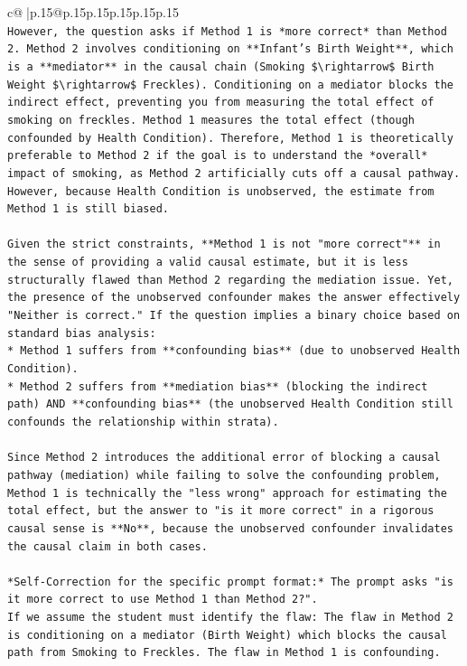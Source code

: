 \documentclass{article}
\begin{document}
{\begin{supertabular}{c@{$\;$}|p{.15\linewidth}@{}p{.15\linewidth}p{.15\linewidth}p{.15\linewidth}p{.15\linewidth}p{.15\linewidth}}
{{{\\ 
\texttt{However, the question asks if Method 1 is *more correct* than Method 2. Method 2 involves conditioning on **Infant's Birth Weight**, which is a **mediator** in the causal chain (Smoking \$\textbackslash{}rightarrow\$ Birth Weight \$\textbackslash{}rightarrow\$ Freckles). Conditioning on a mediator blocks the indirect effect, preventing you from measuring the total effect of smoking on freckles. Method 1 measures the total effect (though confounded by Health Condition). Therefore, Method 1 is theoretically preferable to Method 2 if the goal is to understand the *overall* impact of smoking, as Method 2 artificially cuts off a causal pathway. However, because Health Condition is unobserved, the estimate from Method 1 is still biased.} \\
\\ 
\texttt{Given the strict constraints, **Method 1 is not "more correct"** in the sense of providing a valid causal estimate, but it is less structurally flawed than Method 2 regarding the mediation issue. Yet, the presence of the unobserved confounder makes the answer effectively "Neither is correct." If the question implies a binary choice based on standard bias analysis:} \\
\texttt{*   Method 1 suffers from **confounding bias** (due to unobserved Health Condition).} \\
\texttt{*   Method 2 suffers from **mediation bias** (blocking the indirect path) AND **confounding bias** (the unobserved Health Condition still confounds the relationship within strata).} \\
\\ 
\texttt{Since Method 2 introduces the additional error of blocking a causal pathway (mediation) while failing to solve the confounding problem, Method 1 is technically the "less wrong" approach for estimating the total effect, but the answer to "is it more correct" in a rigorous causal sense is **No**, because the unobserved confounder invalidates the causal claim in both cases.} \\
\\ 
\texttt{*Self{-}Correction for the specific prompt format:* The prompt asks "is it more correct to use Method 1 than Method 2?".} \\
\texttt{If we assume the student must identify the flaw: The flaw in Method 2 is conditioning on a mediator (Birth Weight) which blocks the causal path from Smoking to Freckles. The flaw in Method 1 is confounding.} \\
}}}
\end{supertabular}}
\end{document}
